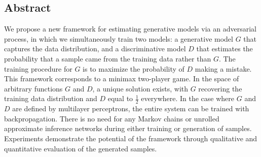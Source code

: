 \begin{center}
	\section*{Abstract}
	\parbox[c]{0.8\textwidth}{
		\justifying
		\noindent We propose a new framework for estimating generative models via an adversarial process, in which we simultaneously train two models: a generative model $G$ that captures the data distribution, and a discriminative model $D$ that estimates the probability that a sample came from the training data rather than $G$. The training procedure for $G$ is to maximize the probability of $D$ making a mistake. This framework corresponds to a minimax two-player game. In the space of arbitrary functions $G$ and $D$, a unique solution exists, with $G$ recovering the training data distribution and $D$ equal to $\frac{1}{2}$ everywhere. In the case where $G$ and $D$ are defined by multilayer perceptrons, the entire system can be trained with backpropagation. There is no need for any Markov chains or unrolled approximate inference networks during either training or generation of samples. Experiments demonstrate the potential of the framework through qualitative and quantitative evaluation of the generated samples.
	}
\end{center}
